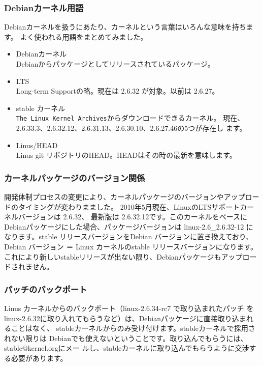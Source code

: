 \documentclass[mingoth,a4paper]{jsarticle}
\begin{document}
\subsubsection{Debianカーネル用語}
Debianカーネルを扱うにあたり、カーネルという言葉はいろんな意味を持ちます。
よく使われる用語をまとめてみました。
\begin{itemize}
\item Debianカーネル\\
Debianからパッケージとしてリリースされているパッケージ。
\item LTS \\
Long-term Supportの略。現在は 2.6.32 が対象。以前は 2.6.27。
\item stable カーネル \\
\texttt{The Linux Kernel Archives}からダウンロードできるカーネル。
現在、2.6.33.3、2.6.32.12、2.6.31.13、2.6.30.10、2.6.27.46の5つが存在し
ます。
\item Linus/HEAD \\
Linus git リポジトリのHEAD。HEADはその時の最新を意味します。
\end{itemize}

\subsubsection{カーネルパッケージのバージョン関係}

開発体制プロセスの変更により、カーネルパッケージのバージョンやアップロー
ドのタイミングが変わりまました。
2010年5月現在、LinuxのLTSサポートカーネルバージョンは 2.6.32、
最新版は 2.6.32.12です。このカーネルをベースにDebianパッケージにした場合、パッケージバージョンは
linux-2.6\_2.6.32-12 になります。stable リリースバージョンをDebian
バージョンに置き換えており、Debian バージョン ＝ Linux カーネルのstable
リリースバージョンになります。
これにより新しいstableリリースが出ない限り、Debianパッケージもアップロー
ドされません。

\subsubsection{パッチのバックポート}
Linus カーネルからのバックポート（linux-2.6.34-rc7 で取り込まれたパッチ
をlinux-2.6.32に取り入れてもらうなど）は、Debianパッケージに直接取り込まれることはなく、
stableカーネルからのみ受け付けます。stableカーネルで採用されない限りは
Debianでも使えないということです。取り込んでもらうには、stable@kernel.orgにメー
ルし、stableカーネルに取り込んでもらうように交渉する必要があります。
\end{document}
